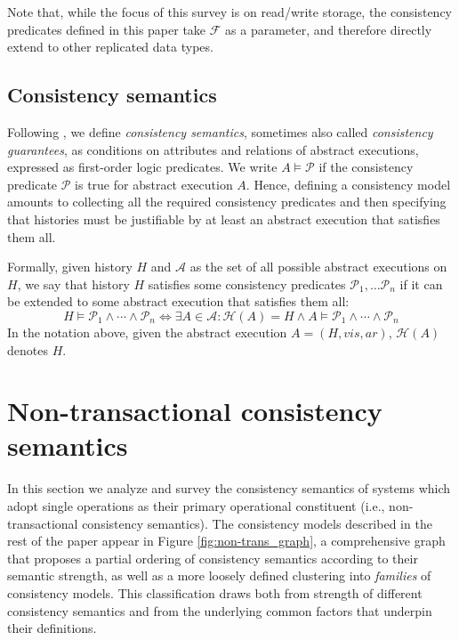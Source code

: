 \documentclass[letter, 11pt]{article}
\newcommand{\citeN}{\citet}
\newcommand{\A}{\ensuremath{A}}
\begin{document}
Note that, while the focus of this survey is on read/write storage, the consistency predicates defined in this paper take $\mathcal{F}$ as a parameter, and therefore directly extend to other replicated data types. 

\subsection{Consistency semantics}

Following \citeN{Burckhardt:14}, we define \emph{consistency semantics},  
sometimes also called \emph{consistency guarantees},  as conditions on attributes
and relations of abstract executions, expressed as first-order logic predicates.
We write $\A \models \mathcal{P}$ if the consistency predicate $\mathcal{P}$ is true for abstract execution $\A$. 
Hence, defining a consistency model amounts to collecting all the required consistency predicates 
and then specifying that histories must be justifiable by at least an abstract execution 
that satisfies them all.

Formally, given history $H$ and $\mathcal{\A}$ as the set of all possible abstract executions on $H$,
we say that history $H$ satisfies some consistency predicates 
$\mathcal{P}_1, \dotsc \mathcal{P}_n$
if it can be extended to some abstract execution that satisfies them all:
\begin{equation} 
H \models \mathcal{P}_1 \wedge \dotsb \wedge \mathcal{P}_n \Leftrightarrow \exists \A \in \mathcal{\A} : \mathcal{H}(\A) = H \wedge \A \models \mathcal{P}_1 \wedge \dotsb \wedge \mathcal{P}_n
\end{equation}
In the notation above, given the abstract execution $\A = (H,vis,ar)$, $\mathcal{H}(\A)$ denotes $H$.


 \section{Non-transactional consistency semantics}
\label{sec:nontrans}



In this section we analyze and survey the consistency semantics of systems which adopt single operations as their primary  operational constituent (i.e., non-transactional consistency semantics).
The consistency models described in the rest of the paper appear in Figure \ref{fig:non-trans_graph},
a comprehensive graph that proposes a partial ordering of consistency semantics according to their semantic strength, as well as a more loosely defined clustering into \emph{families} of consistency models. This classification draws both from strength of different consistency semantics  and from the underlying common factors that underpin their definitions.
\end{document}
